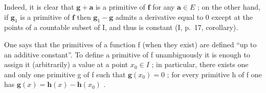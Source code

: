 Indeed, it is clear that \(\mathbf{g} + \mathbf{a}\) is a primitive of \(\mathbf{f}\) for any \(\mathbf{a} \in E\) ; on the other hand, if \(\mathbf{g}_1\) is a primitive of \(\mathbf{f}\) then \(\mathbf{g}_1 - \mathbf{g}\) admits a derivative equal to 0 except at the points of a countable subset of I, and thus is constant (I, p.~17, corollary).

One says that the primitives of a function f (when they exist) are defined ``up to an additive constant''. To define a primitive of f unambiguously it is enough to assign it (arbitrarily) a value at a point \(x_{0} \in I\) ; in particular, there exists one and only one primitive g of f such that \(\mathbf{g}(x_{0}) = 0\) ; for every primitive h of f one has \(\mathbf{g}(x) = \mathbf{h}(x) - \mathbf{h}(x_{0})\) .

